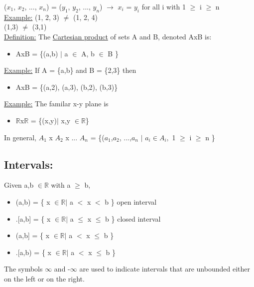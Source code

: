 \documentclass{article}
\begin{document}
($x_{1}$, $x_{2}$, ..., $x_{n}$) = ($y_{1}$, $y_{2}$, ..., $y_{n}$) $\rightarrow$ $x_{i}$ = $y_{i}$ for all i with 1 $\geq$ i $\geq$ 
n \\

\underline{Example:} (1, 2, 3) $\neq$ (1, 2, 4) \\
(1,3) $\neq$ (3,1) \\

\underline{Definition:} The \underline{Cartesian product} of sets A and B, denoted AxB is:
\begin{itemize}
\item AxB = \{(a,b) $|$ a $\in$ A, b $\in$ B \}
\end{itemize}

\underline{Example:} If A = \{a,b\} and B = \{2,3\} then
\begin{itemize}
\item AxB = \{(a,2), (a,3), (b,2), (b,3)\}
\end{itemize}

\underline{Example:} The familar x-y plane is
\begin{itemize}
\item $\mathbb{R}$x$\mathbb{R}$ = \{(x,y)$|$ x,y $\in \mathbb{R}$\}
\end{itemize}

In general,
$A_{1}$ x $A_{2}$ x  ... $A_{n}$ = \{($a_{1}$,$a_{2}$, ...,$a_{n}$ $|$ $a_{i} \in A_{i},$ 1 $\geq$ i $\geq$ n \} \\

\subsection{Intervals:}

Given a,b $\in \mathbb{R}$ with a $\geq$ b, \\

\begin{itemize}
\item (a,b) = \{ x $\in \mathbb{R} |$ a $<$ x $<$ b \}     open interval
\item .[a,b] = \{ x $\in \mathbb{R} |$ a $\leq$ x $\leq$ b \}     closed interval
\item (a,b] = \{ x $\in \mathbb{R} |$ a $<$ x $\leq$ b \}
\item .[a,b) = \{ x $\in \mathbb{R} |$ a $<$ x $\leq$ b \}
\end{itemize}

The symbols $\infty$ and -$\infty$ are used to indicate intervals that are unbounded either on the left or on the right.
\end{document}

